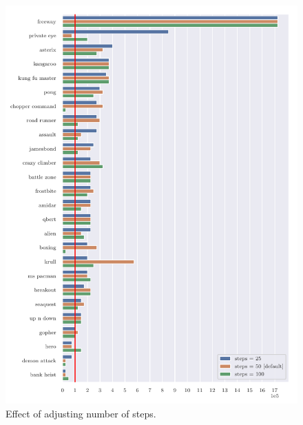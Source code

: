 \begin{figure}
\centering
\includegraphics[width=0.9\columnwidth]{figures/graph_Effect_of_adjusting_number_of_steps.pdf}
\caption{Effect of adjusting number of steps.} 
\label{fig:adj_steps}
\label{fig:100steps}
\end{figure}


